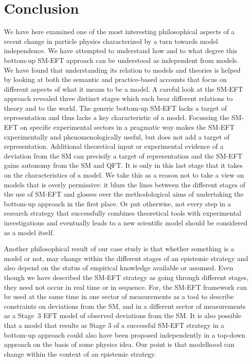 \section{Conclusion}


We have here examined one of the most interesting philosophical aspects of a recent change in particle physics characterized by a turn towards model independence. 
We have attempted to understand how and to what degree this bottom-up SM-EFT approach can be understood as independent from models. 
We have found that understanding its relation to models and theories is helped by looking at both the semantic and practice-based accounts that focus on different aspects of what it means to be a model. 
A careful look at the SM-EFT approach revealed three distinct stages which each bear different relations to theory and to the world. 
The generic bottom-up SM-EFT lacks a target of representation and thus lacks a key characteristic of a model. 
Focussing the SM-EFT on specific experimental sectors in a pragmatic way makes the SM-EFT experimentally and phenomenologically useful, but does not add a target of representation. 
Additional theoretical input or experimental evidence of a deviation from the SM can precisify a target of representation and the SM-EFT gains autonomy from the SM and QFT. It is only in this last stage that it takes on the characteristics of a model.
We take this as a reason not to take a view on models that is overly permissive: it blurs the lines between the different stages of the use of SM-EFT and glosses over the methodological aims of undertaking the bottom-up approach in the first place. 
Or put otherwise, not every step in a research strategy that successfully combines theoretical tools with experimental investigations and eventually leads to a new scientific model should be considered as a model itself.

Another philosophical result of our case study is that whether something is a model or not, may change within the different stages of an epistemic strategy and also depend on the status of empirical knowledge available or assumed.
Even though we have described the SM-EFT strategy as going through different stages, they need not occur in real time or in sequence. For, the SM-EFT framework can be used at the same time in one sector of measurements as a tool to describe constraints on deviations from the SM, and in a different sector of measurements as a Stage~3 EFT model of observed deviations from the SM.
It is also possible that a model that results as Stage 3 of a successful SM-EFT strategy in a bottom-up approach could also have been proposed independently in a top-down approach on the basis of some physics idea. Our point is that modelhood can change within the context of an epistemic strategy.







